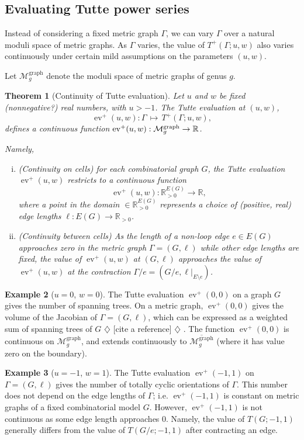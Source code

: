 \documentclass{amsart}
\newtheorem{thm}{Theorem}
\theoremstyle{definition}
\newtheorem{eg}[thm]{Example}
\newcommand{\RR}{\mathbb{R}}
\newcommand{\RRpos}{\RR_{>0}}
\DeclareMathOperator{\ev}{ev}
\newcommand{\Mgraphg}{\mathcal M_g^{\mathrm{graph}}}
\newcommand{\harry}[1]{{\color{red} \sf $\diamondsuit$  {#1} $\diamondsuit$ }}
\newcommand{\note}[1]{\harry{#1}}
\begin{document}
\subsection{Evaluating Tutte power series}

Instead of considering a fixed metric graph $\Gamma$,
we can 
vary $\Gamma$ over a natural moduli space of metric graphs.
As $\Gamma$ varies, the value of $T^+(\Gamma;u,w)$ also varies continuously under certain mild assumptions on the parameters $(u, w)$.

Let $\Mgraphg$ denote the moduli space of metric graphs of genus $g$.
\begin{thm}[Continuity of Tutte evaluation]
\label{thm:tutte-eval-moduli}
Let $u$ and $w$ be fixed (nonnegative?) real numbers,
with $u > -1$.
The Tutte evaluation at $(u,w)$,
$$ \ev^+(u,w) : \Gamma \,\mapsto\, T^+(\Gamma; u,w) ,$$
defines a continuous function  
${\rm ev}^+(u,w) : \Mgraphg \to \RR$.

Namely, 
\begin{enumerate}[(i)]
\item 
(Continuity on cells)
for each combinatorial graph $G$,
the Tutte evaluation 
$\ev^+(u,w) $ 
restricts to a continuous function
\[
	\ev^+(u,w) : \RRpos^{E(G)} \to \RR,
\]
where a point in the domain $ \in \RRpos^{E(G)}$
represents a choice of (positive, real) edge lengths  $\ell : E(G) \to \RRpos$.

\item 
(Continuity between cells)
As the length of a  non-loop edge $e \in E(G)$ approaches zero
in the metric graph $\Gamma = (G,\ell)$
while other edge lengths are fixed,
the value of 
$\ev^+(u,w)$
at $(G,\ell)$ %
approaches the value of $\ev^+(u,w)$ at the contraction 
$\Gamma / e = (G / e, \ell \big|_{E\setminus e})$.
\end{enumerate}
\end{thm}

\begin{eg}
[$u = 0$, $w = 0$]
The Tutte evaluation $\ev^+(0, 0)$ 
on a graph $G$ gives the number of spanning trees.
On a metric graph, $\ev^+(0, 0)$ gives the volume of the Jacobian of
$\Gamma = (G,\ell)$,
which can be expressed as a weighted sum of spanning trees of $G$ \note{[cite a reference]}.
The function $\ev^+(0, 0)$ is continuous on $\Mgraphg$, 
and extends continuously to $\overline{\Mgraphg}$ 
(where it has value zero on the boundary).
\end{eg}
\begin{eg}
[$u = -1$, $w = 1$]
The Tutte evaluation $\ev^+(-1, 1)$ 
on $\Gamma = (G,\ell)$ gives the number of totally cyclic orientations of $\Gamma$.
This number does not depend on the edge lengths of $\Gamma$;
i.e. $\ev^+(-1, 1)$
 is constant on metric graphs %
of a fixed combinatorial model $G$.
However, $\ev^+(-1, 1)$ is not continuous as some edge length approaches $0$.
Namely, the value of $T(G; -1, 1)$ generally differs from the value of $T(G/e; -1, 1)$
after contracting an edge.
\end{eg}
\end{document}
